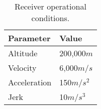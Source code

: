 \begin{table}[!htb]
\centering
\begin{tabular}{|l|l|}
\hline
\rowcolor[HTML]{C0C0C0} 
Parameter    & Value                    \\ \hline
Altitude     & 200,000$m$                 \\ \hline
\rowcolor[HTML]{EFEFEF} 
Velocity     & 6,000$m/s$                 \\ \hline
Acceleration & 150$m/s^2$ \\ \hline
\rowcolor[HTML]{EFEFEF} 
Jerk         & 10$m/s^3$  \\ \hline
\end{tabular}
\caption{Receiver operational conditions.}
\label{tab:Requirements}
\end{table}